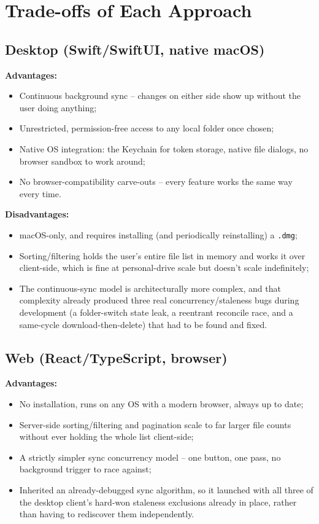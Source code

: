 \documentclass[12pt,a4paper]{article}
\begin{document}
\section{Trade-offs of Each Approach}

\subsection{Desktop (Swift/SwiftUI, native macOS)}

\textbf{Advantages:}
\begin{itemize}[nosep]
    \item Continuous background sync -- changes on either side show up without the user doing anything;
    \item Unrestricted, permission-free access to any local folder once chosen;
    \item Native OS integration: the Keychain for token storage, native file dialogs, no browser sandbox to work around;
    \item No browser-compatibility carve-outs -- every feature works the same way every time.
\end{itemize}

\textbf{Disadvantages:}
\begin{itemize}[nosep]
    \item macOS-only, and requires installing (and periodically reinstalling) a \texttt{.dmg};
    \item Sorting/filtering holds the user's entire file list in memory and works it over client-side, which is fine at personal-drive scale but doesn't scale indefinitely;
    \item The continuous-sync model is architecturally more complex, and that complexity already produced three real concurrency/staleness bugs during development (a folder-switch state leak, a reentrant reconcile race, and a same-cycle download-then-delete) that had to be found and fixed.
\end{itemize}

\subsection{Web (React/TypeScript, browser)}

\textbf{Advantages:}
\begin{itemize}[nosep]
    \item No installation, runs on any OS with a modern browser, always up to date;
    \item Server-side sorting/filtering and pagination scale to far larger file counts without ever holding the whole list client-side;
    \item A strictly simpler sync concurrency model -- one button, one pass, no background trigger to race against;
    \item Inherited an already-debugged sync algorithm, so it launched with all three of the desktop client's hard-won staleness exclusions already in place, rather than having to rediscover them independently.
\end{itemize}
\end{document}
